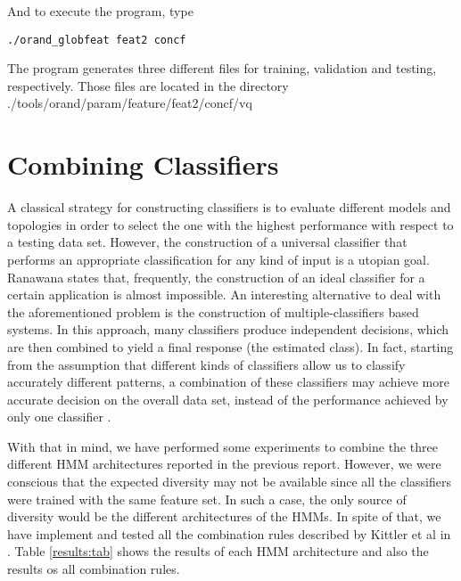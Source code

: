 \documentclass{article}[14pt, oneside, a4paper, times]
\begin{document}
\noindent And to execute the program, type

\begin{verbatim}
./orand_globfeat feat2 concf
\end{verbatim}

The program generates three different files for training, validation and testing, respectively. Those files are located in the directory \textsf{./tools/orand/param/feature/feat2/concf/vq} 



\section{Combining Classifiers}


A classical strategy for constructing classifiers is to evaluate different models and topologies in order to select the one with the highest performance with respect to a testing data set. However, the construction of a universal classifier that performs an appropriate classification for any kind of input is a utopian goal. Ranawana \cite{Ranawana06} states that, frequently, the construction of an ideal classifier for a certain application is almost impossible. An interesting alternative to deal with the aforementioned problem is the construction of multiple-classifiers based systems. In this approach, many classifiers produce independent decisions, which are then combined to yield a final response (the estimated class). In fact, starting from the assumption that different kinds of classifiers allow us to classify accurately different patterns, a combination of these classifiers may achieve more accurate decision on the overall data set, instead of the performance achieved by only one classifier \cite{Brown05,Kuncheva03,Kittler98}.

With that in mind, we have performed some experiments to combine the three different HMM architectures reported in the previous report. However, we were conscious that the expected diversity may not be available since all the classifiers were trained with the same feature set. In  such a case, the only source of diversity would be the different architectures of the HMMs. In spite of that, we have implement and tested all the combination rules described by Kittler et al in \cite{Kittler98}. Table \ref{results:tab} shows the results of each HMM architecture and also the results os all combination rules.
\end{document}
